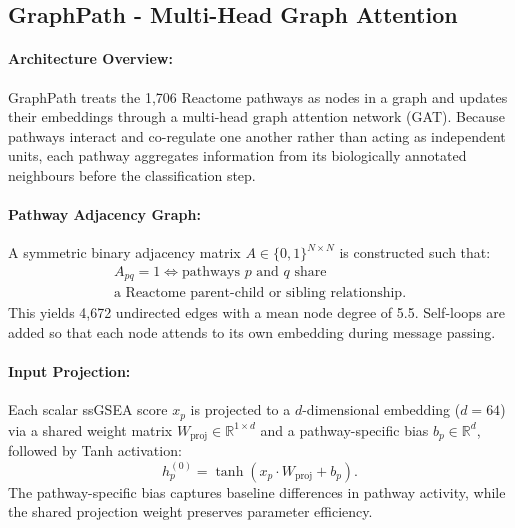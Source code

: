 \documentclass[sigconf]{acmart}
\begin{document}
\subsection{GraphPath - Multi-Head Graph Attention}

\paragraph{Architecture Overview:}
GraphPath treats the 1,706 Reactome pathways as nodes in a graph and
updates their embeddings through a multi-head graph attention network
(GAT). Because pathways interact and co-regulate one another rather
than acting as independent units, each pathway aggregates information
from its biologically annotated neighbours before the classification
step.

\paragraph{Pathway Adjacency Graph:}
A symmetric binary adjacency matrix $A \in \{0,1\}^{N \times N}$ is
constructed such that:
\begin{equation}
\begin{gathered}
A_{pq} = 1 \iff \text{pathways } p \text{ and } q \text{ share} \\[4pt]
\text{a Reactome parent-child or sibling relationship.}
\end{gathered}
\end{equation}
This yields 4,672 undirected edges with a mean node degree of 5.5.
Self-loops are added so that each node attends to its own embedding
during message passing.

\paragraph{Input Projection:}
Each scalar ssGSEA score $x_p$ is projected to a $d$-dimensional
embedding ($d = 64$) via a shared weight matrix
$W_{\text{proj}} \in \mathbb{R}^{1 \times d}$ and a pathway-specific
bias $b_p \in \mathbb{R}^d$, followed by Tanh activation:
\begin{equation}
h^{(0)}_p = \tanh\!\left(x_p \cdot W_{\text{proj}} + b_p\right).
\end{equation}
The pathway-specific bias captures baseline differences in pathway
activity, while the shared projection weight preserves parameter
efficiency.
\end{document}
